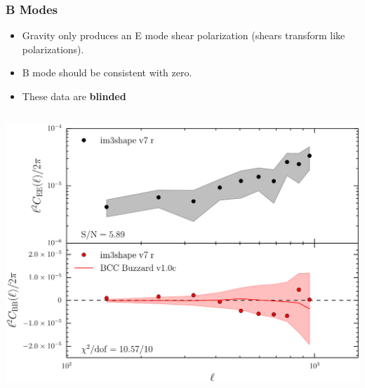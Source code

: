 \documentclass{beamer}
\begin{document}
\frame
{
    \frametitle{B Modes}

    \fontsize{9}{0.8\baselineskip}
    \begin{itemize}

        \item Gravity only produces an E mode shear polarization (shears transform like
            polarizations).

        \item B mode should be consistent with zero.
    
        \item These data are {\bf blinded}

    \end{itemize}

    \begin{columns}


        \begin{column}{0.5\textwidth}
            \begin{center}
                \includegraphics[width=1.05\textwidth]{im3shape_v7_r_crop.pdf}
            \end{center}
        \end{column}


\end{columns}}
\end{document}
